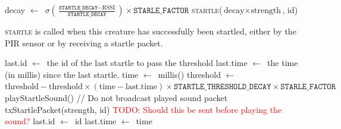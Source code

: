 \documentclass{article}
\newcommand\code{\texttt}
\newcommand\assign{\ensuremath{\leftarrow}~}
\newcommand\todo[1]{\textcolor{red}{TODO: #1}}
\begin{document}
\begin{algorithm}
    \begin{algorithmic}[1]
            \State decay \assign $\sigma\left(\frac{\code{STARTLE\_DECAY} - \text{RSSI}}{\code{STARTLE\_DECAY}}\right) \times \code{STARLE\_FACTOR}$
            \State \textsc{startle}($\text{decay} \times \text{strength}$, id)
        \EndFunction
    \end{algorithmic}
\end{algorithm}

\textsc{startle} is called when this creature has successfully been startled, either by the PIR sensor or by receiving a startle packet.

\begin{algorithm}
    \begin{algorithmic}[1]
        \State last.id \assign the id of the last startle to pass the threshold
        \State last.time \assign the time (in millis) since the last startle.
                \State time \assign millis()
                \State threshold \assign $\text{threshold} - \text{threshold} \times (\text{time} - \text{last.time}) \times \code{STARTLE\_THRESHOLD\_DECAY}\times \code{STARLE\_FACTOR}$
                    \State playStartleSound() // Do not broadcast played sound packet
                    \State txStartlePacket(strength, id) \todo{Should this be sent before playing the sound?}
                    \State last.id \assign id
                \EndIf
                \State last.time \assign time
            \EndIf
        \EndFunction
    \end{algorithmic}
\end{algorithm}



\end{document}
